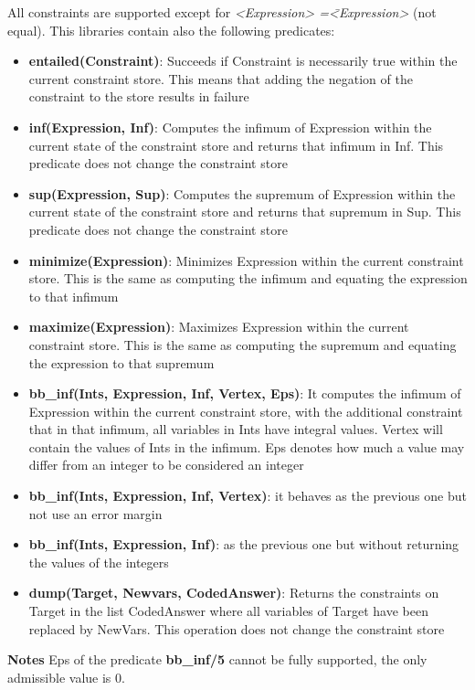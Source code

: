 All constraints are supported except for \textit{<Expression> =\= <Expression>} (not equal).
This libraries contain also the following predicates:
\begin{itemize}
    \item \textbf{entailed(Constraint)}: Succeeds if Constraint is necessarily true within the current constraint store. This means that adding the negation of the constraint to the store results in failure
    \item \textbf{inf(Expression, Inf)}: Computes the infimum of Expression within the current state of the constraint store and returns that infimum in Inf. This predicate does not change the constraint store
    \item \textbf{sup(Expression, Sup)}: Computes the supremum of Expression within the current state of the constraint store and returns that supremum in Sup. This predicate does not change the constraint store
    \item \textbf{minimize(Expression)}: Minimizes Expression within the current constraint store. This is the same as computing the infimum and equating the expression to that infimum
    \item \textbf{maximize(Expression)}: Maximizes Expression within the current constraint store. This is the same as computing the supremum and equating the expression to that supremum
    \item \textbf{bb\_inf(Ints, Expression, Inf, Vertex, Eps)}: It computes the infimum of Expression within the current constraint store, with the additional constraint that in that infimum, all variables in Ints have integral values. Vertex will contain the values of Ints in the infimum. Eps denotes how much a value may differ from an integer to be considered an integer
    \item \textbf{bb\_inf(Ints, Expression, Inf, Vertex)}: it behaves as the previous one but not use an error margin
    \item \textbf{bb\_inf(Ints, Expression, Inf)}: as the previous one but without returning the values of the integers
    \item \textbf{dump(Target, Newvars, CodedAnswer)}: Returns the constraints on Target in the list CodedAnswer where all variables of Target have been replaced by NewVars. This operation does not change the constraint store
\end{itemize}
\textbf{Notes}\newline\newline
Eps of the predicate \textbf{bb\_inf/5} cannot be fully supported, the only admissible value is 0.

